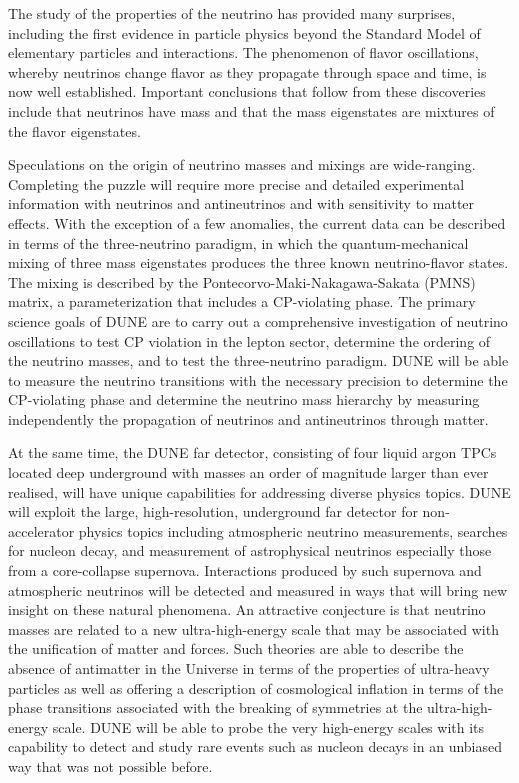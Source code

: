 The study of the properties of the neutrino has provided many surprises, including the first evidence in particle physics beyond the Standard Model of elementary particles and interactions.   The phenomenon of flavor oscillations, whereby neutrinos change flavor as they propagate through space and time, is now well established. Important conclusions that follow from these discoveries include that neutrinos have mass and that the mass eigenstates are mixtures of the flavor eigenstates.

Speculations on the origin of neutrino masses and mixings are wide-ranging. 
Completing the puzzle will require more precise and detailed experimental information with neutrinos and antineutrinos and with sensitivity to matter effects. With the exception of a few anomalies, the current data can be described in terms of the three-neutrino paradigm, in which the quantum-mechanical mixing of three mass eigenstates produces the three known neutrino-flavor states.  The mixing is described by the Pontecorvo-Maki-Nakagawa-Sakata (PMNS) matrix, a parameterization that includes a CP-violating phase. 
The primary science goals of DUNE are to carry out a comprehensive investigation of neutrino oscillations to test CP violation in the lepton sector, determine the ordering of the neutrino masses, and to test the three-neutrino paradigm.
DUNE will be able to measure the neutrino transitions with the necessary precision to determine the CP-violating phase and determine the neutrino mass hierarchy by measuring independently the  propagation of neutrinos and antineutrinos through matter.

At the same time, the DUNE far detector, consisting of four liquid argon TPCs located deep underground with masses an order of magnitude larger than ever realised, will have unique capabilities for addressing diverse physics topics. 
DUNE will exploit the large, high-resolution, underground far detector for non-accelerator physics topics including atmospheric neutrino measurements, searches for nucleon decay, and measurement of astrophysical neutrinos especially those from a core-collapse supernova.
Interactions produced by such supernova and atmospheric neutrinos will be detected and measured in ways that will bring new insight on these natural phenomena. 
An attractive conjecture is that neutrino masses are related to a new ultra-high-energy scale that may be associated with the unification of matter and forces. Such theories are able to describe the absence of antimatter in the Universe in terms of the properties of ultra-heavy particles as well as offering a description of cosmological inflation in terms of the phase transitions associated with the breaking of symmetries at the ultra-high-energy scale. DUNE will be able to probe the very high-energy scales with its capability to detect and study rare events such as nucleon decays in an unbiased way that was not possible before. 

